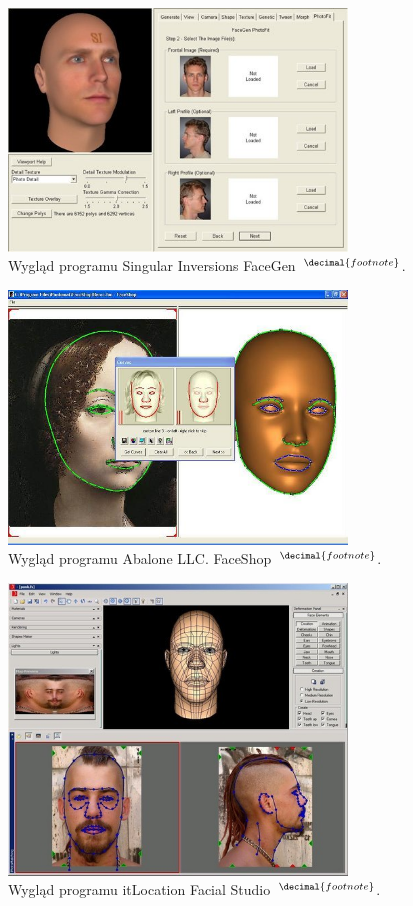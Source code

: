 \addtocounter{footnote}{1}
\begin{figure}[h!]
  \centering
  \includegraphics[width=9cm]{images/facegen.jpg}
  \caption[Singular Inversions FaceGen.]{Wygląd programu Singular Inversions
  FaceGen~$^{\decimal{footnote}}$.}
  \label{facegen}
\end{figure}
\addtocounter{footnote}{1}
\begin{figure}[h!]
  \centering
  \includegraphics[width=9cm]{images/faceshop.jpg}
  \caption[Abalone LLC. FaceShop.]{Wygląd programu Abalone LLC.
  FaceShop~$^{\decimal{footnote}}$.}
  \label{faceshop}
\end{figure}
\addtocounter{footnote}{1}
\begin{figure}[h!]
  \centering
  \includegraphics[width=9cm]{images/facialstudio.jpg}
  \caption[itLocation Facial Studio.]{Wygląd programu itLocation Facial
  Studio~$^{\decimal{footnote}}$.}
  \label{facialstudio}
\end{figure}

